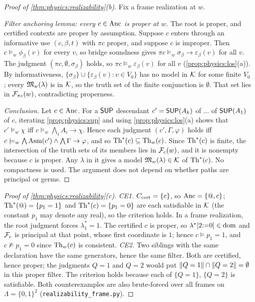 \begin{proof}[Proof of \cref{thm:physics:realizability}(b)]
Fix a frame realization at $w$.

\emph{Filter anchoring lemma: every $c\in\mathrm{Anc}$ is proper at $w$.} The root is proper, and
certified contexts are proper by assumption. Suppose $c$ enters through an informative use
$(c,\beta,t)$ with $\pi c$ proper, and suppose $c$ is improper. Then $c\models_w\phi_\beta(v)$
for every $v$, so bridge soundness gives $\pi c\models_w\sigma_\beta\to\varepsilon_\beta(v)$
for all $v$. The judgment $(\pi c,\emptyset,\sigma_\beta)$ holds, so
$\pi c\models_w\varepsilon_\beta(v)$ for all $v$ (\cref{prop:physics:los}(a)). By
informativeness, $\{\sigma_\beta\}\cup\{\varepsilon_\beta(v):v\in V_0\}$ has no model in $\mathcal{K}$
for some finite $V_0$; every $\mathfrak{M}_w(\lambda)$ is in $\mathcal{K}$, so the truth set of the finite
conjunction is $\emptyset$. That set lies in $\mathcal{F}_{\pi c}(w)$, contradicting properness.

\emph{Conclusion.} Let $c\in\mathrm{Anc}$. For a $\mathsf{SUP}$ descendant
$c'=\mathsf{SUP}(A_k)$ of $\dots$ of $\mathsf{SUP}(A_1)$ of $c$, iterating \cref{prop:physics:sup} and
using \cref{prop:physics:los}(a) shows that $c'\models_w\chi$ iff
$c\models_w\bigwedge_iA_i\to\chi$. Hence each judgment $(c',\Gamma,\varphi)$ holds iff
$c\models_w\bigwedge\mathrm{Asm}(c')\wedge\bigwedge\Gamma\to\varphi$, and so $\mathrm{Th}^*(c)\subseteq\mathrm{Th}_w(c)$.
Since $\mathrm{Th}^*(c)$ is finite, the intersection of the truth sets of its members lies in
$\mathcal{F}_c(w)$, and it is nonempty because $c$ is proper. Any $\lambda$ in it gives a model
$\mathfrak{M}_w(\lambda)\in\mathcal{K}$ of $\mathrm{Th}^*(c)$. No compactness is used. The argument does not
depend on whether paths are principal or germs.
\end{proof}

\begin{proof}[Proof of \cref{thm:physics:realizability}(c)]
\emph{CE1.} $C_{\mathrm{cert}}=\{c\}$, so $\mathrm{Anc}=\{@,c\}$; $\mathrm{Th}^*(@)=\{p_1=1\}$ and $\mathrm{Th}^*(c)=\{p_1=0\}$ are
each satisfiable in $\mathcal{K}$ (the constant $p_1$ may denote any real), so the criterion holds.
In a frame realization, the root judgment forces $\lambda^*_1=1$. The certified $c$ is
proper, so $\lambda^*[2{:=}0]\in\operatorname{dom}$ and $\mathcal{F}_c$ is principal at that point, whose first
coordinate is $1$; hence $c\models p_1=1$, and $c\not\models p_1=0$ since $\mathrm{Th}_w(c)$ is
consistent. \emph{CE2.} Two siblings with the same declaration have the same generators,
hence the same filter. Both are certified, hence proper; the judgments $Q=1$ and $Q=2$
would put $\lVert Q=1\rVert\cap\lVert Q=2\rVert=\emptyset$ in this proper filter. The criterion holds
because each of $\{Q=1\}$, $\{Q=2\}$ is satisfiable. Both counterexamples are also
brute-forced over all frames on $\Lambda=\{0,1\}^2$ (\texttt{realizability\_frame.py}).
\end{proof}

